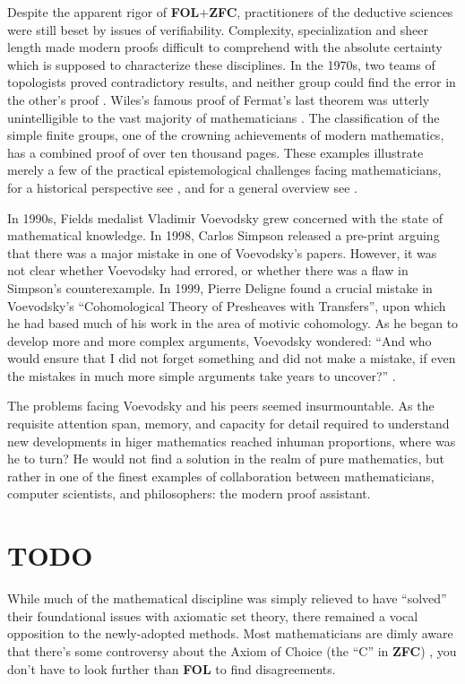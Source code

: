 \documentclass[12pt,twoside,draft]{reedthesis}
\makeatletter
\newcommand{\TODO}[1]{\marginpar{\footnotesize\color{TODO}todo: #1}}
\let\oldindex\index
\renewcommand{\index}[1]{\oldindex{#1}\marginpar{\footnotesize\color{index}index: #1}}
\newcommand{\indeX}[1]{\oldindex{#1}}
\newcommand{\abbreviation}[1]{\textbf{#1}\indeX{#1@\textbf{#1}}} %
\makeatother
\begin{document}
Despite the apparent rigor of \abbreviation{FOL}+\abbreviation{ZFC},
practitioners of the deductive sciences were still beset by issues of
verifiability. Complexity, specialization and sheer length made modern proofs
difficult to comprehend with the absolute certainty which is supposed to
characterize these disciplines. In the 1970s, two teams of topologists proved
contradictory results, and neither group could find the error in the other's
proof \cite{kolata}. Wiles's famous proof of Fermat's last theorem was utterly
unintelligible to the vast majority of mathematicians \cite{nyt}. The
classification of the simple finite groups, one of the crowning achievements of
modern mathematics, has a combined proof of over ten thousand pages. These
examples illustrate merely a few of the practical epistemological challenges
facing mathematicians, for a historical perspective see \cite{rigor-and-proof},
and for a general overview see \cite{fidelity}.

In 1990s, Fields medalist Vladimir Voevodsky grew concerned with the state
of mathematical knowledge. In 1998, Carlos Simpson released a pre-print arguing
that there was a major mistake in one of Voevodsky's papers. However, it was not
clear whether Voevodsky had errored, or whether there was a flaw in Simpson's
counterexample. In 1999, Pierre Deligne found a crucial mistake in Voevodsky's
``Cohomological Theory of Presheaves with Transfers'', upon which he had based
much of his work in the area of motivic cohomology. As he began to develop more
and more complex arguments, Voevodsky wondered: ``And who would ensure that I
did not forget something and did not make a mistake, if even the mistakes in
much more simple arguments take years to uncover?'' \cite{voevodsky-ias}. 

The problems facing Voevodsky and his peers seemed insurmountable.
As the requisite attention span, memory, and capacity for detail required to
understand new developments in higer mathematics reached inhuman proportions,
where was he to turn? He would not find a solution in the realm of pure
mathematics, but rather in one of the finest examples of collaboration between
mathematicians, computer scientists, and philosophers: the modern proof
assistant. \TODO{reword}

\section*{TODO}

While much of the mathematical discipline was simply relieved to have ``solved''
their foundational issues with axiomatic set theory, there remained a vocal
opposition to the newly-adopted methods. Most mathematicians are dimly aware
that there's some controversy about the Axiom of Choice (the ``C'' in
\abbreviation{ZFC}) \cite{martin-lof-100-years}, you don't have to look further
than \abbreviation{FOL} to find disagreements.
\end{document}
